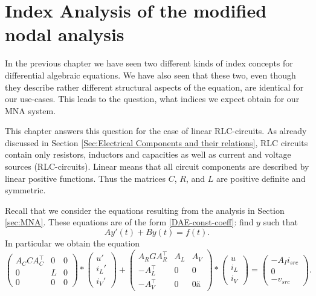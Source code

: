 \chapter{Index Analysis of the modified nodal analysis}

\cite{ModellingAndDiscretizationOfCircuitProblems}

In the previous chapter we have seen two different kinds of index concepts for differential algebraic equations. We have also seen that these two, even though they describe rather different structural aspects of the equation, are identical for our use-cases. This leads to the question, what indices we expect obtain for our MNA system.

This chapter answers this question for the case of linear RLC-circuits. As already discussed in Section \ref{Sec:Electrical Components and their relations}, RLC circuits contain only resistors, inductors and capacities as well as current and voltage sources (RLC-circuits). Linear means that all circuit components are described by linear positive functions. Thus the matrices $C$, $R$, and $L$ are positive definite and symmetric.

Recall that we consider the equations resulting from the analysis in Section \ref{sec:MNA}. These equations are of the form \eqref{DAE-const-coeff}: find $y$ such that
\begin{displaymath}
	A y'(t) + B y(t) = f(t).
\end{displaymath}
In particular we obtain the equation
\begin{displaymath}
	\begin{pmatrix}
		A_C C A_C^\top & 0 & 0 \\
		0 & L & 0 \\
		0 & 0 & 0
	\end{pmatrix}
	*
	\begin{pmatrix}
		u' \\
		i_L' \\
		i_V'
	\end{pmatrix}
	+
	\begin{pmatrix}
		A_R G A_R^\top & A_L & A_V \\
		-A_L^\top & 0 & 0 \\
		-A_V^\top & 0 & 0 ä
	\end{pmatrix}
	*
	\begin{pmatrix}
		u \\
		i_L \\
		i_V
	\end{pmatrix}
	=
	\begin{pmatrix}
		-A_I i_{src} \\
		0 \\
		-v_{src}
	\end{pmatrix}.
\end{displaymath}

